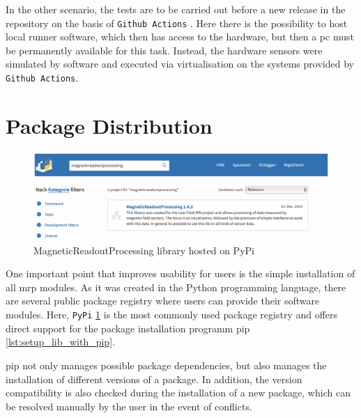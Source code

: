 \newpage

In the other scenario, the tests are to be carried out before a new
release in the repository on the basis of
\passthrough{\lstinline!Github Actions!} \cite{GithubActions}. Here
there is the possibility to host local runner software, which then has
access to the hardware, but then a \gls{pc} must be permanently
available for this task. Instead, the hardware sensors were simulated by
software and executed via virtualisation on the systems provided by
\passthrough{\lstinline!Github Actions!}.

\hypertarget{package-distribution}{%
\section{Package Distribution}\label{package-distribution}}

\begin{figure}
\centering
\includegraphics{./generated_images/border_MagneticReadoutProcessing_library_hosted_on_PyPi.png}
\caption{MagneticReadoutProcessing library hosted on PyPi
\label{MagneticReadoutProcessing_library_hosted_on_PyPi.png}}
\end{figure}

One important point that improves usability for users is the simple
installation of all \gls{mrp} modules. As it was created in the Python
programming language, there are several public package registry where
users can provide their software modules. Here,
\passthrough{\lstinline!PyPi!}\cite{PyPI}
\ref{MagneticReadoutProcessing_library_hosted_on_PyPi.png}
\cite{MagneticReadoutProcessingPyPI} is the most commonly used
package registry and offers direct support for the package installation
programm \gls{pip} \ref{lst:setup_lib_with_pip}.

\gls{pip} not only manages possible package dependencies, but also
manages the installation of different versions of a package. In
addition, the version compatibility is also checked during the
installation of a new package, which can be resolved manually by the
user in the event of conflicts.

